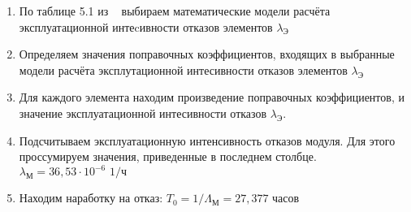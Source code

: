 \begin{enumerate}
\item По таблице 5.1 из ~\cite{Borovikov2010} выбираем математические
модели расчёта эксплуатационной интеcивности отказов элементов
$\lambda_{\text{Э}}$

\item Определяем значения поправочных коэффициентов, входящих в
выбранные модели расчёта эксплутационной интесивности отказов
элементов $\lambda_{\text{Э}}$
\item Для каждого элемента находим произведение поправочных
коэффициентов, и значение эксплуатационной интесивности отказов
$\lambda_{\text{Э}}$.


\item Подсчитываем эксплуатационную интенсивность отказов модуля.
  Для этого проссумируем значения, приведенные в последнем столбце.
  $\lambda_{\text{М}} = 36,53 \cdot 10^{-6} \text{ 1/ч}$
  
\item Находим наработку на отказ:
  $T_0 = 1 / \Lambda_{\text{М}} = 27,377 \text{ часов}$

  
\end{enumerate}
\newpage

